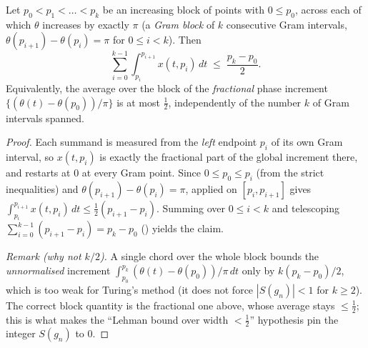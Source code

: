 \begin{theorem}
\label{thm:ga_block}
\leanok
{}
Let $p_0<p_1<\dots<p_k$ be an increasing block of points with $0\le p_0$, across each of
which $\theta$ increases by exactly $\pi$ (a \emph{Gram block} of $k$ consecutive Gram
intervals, $\theta(p_{i+1})-\theta(p_i)=\pi$ for $0\le i<k$). Then
\[
  \sum_{i=0}^{k-1}\int_{p_i}^{p_{i+1}} x(t,p_i)\,dt\;\le\;\frac{p_k-p_0}{2}.
\]
Equivalently, the average over the block of the \emph{fractional} phase increment
$\{(\theta(t)-\theta(p_0))/\pi\}$ is at most $\tfrac12$, independently of the number $k$
of Gram intervals spanned.
\end{theorem}

\begin{proof}
\leanok
{}
Each summand is measured from the \emph{left} endpoint $p_i$ of its own Gram interval, so
$x(t,p_i)$ is exactly the fractional part of the global increment there, and restarts at
$0$ at every Gram point. Since $0\le p_0\le p_i$ (from the strict inequalities) and
$\theta(p_{i+1})-\theta(p_i)=\pi$,  applied on $[p_i,p_{i+1}]$ gives
$\int_{p_i}^{p_{i+1}} x(t,p_i)\,dt\le\tfrac12(p_{i+1}-p_i)$. Summing over $0\le i<k$ and
telescoping $\sum_{i=0}^{k-1}(p_{i+1}-p_i)=p_k-p_0$ () yields
the claim.

\emph{Remark (why not $k/2$).} A single chord over the whole block bounds the
\emph{unnormalised} increment $\int_{p_0}^{p_k}(\theta(t)-\theta(p_0))/\pi\,dt$ only by
$k(p_k-p_0)/2$, which is too weak for Turing's method (it does not force
$|S(g_n)|<1$ for $k\ge2$). The correct block quantity is the fractional one above, whose
average stays $\le\tfrac12$; this is what makes the ``Lehman bound over width $<\tfrac12$''
hypothesis pin the integer $S(g_n)$ to $0$.
\end{proof}

